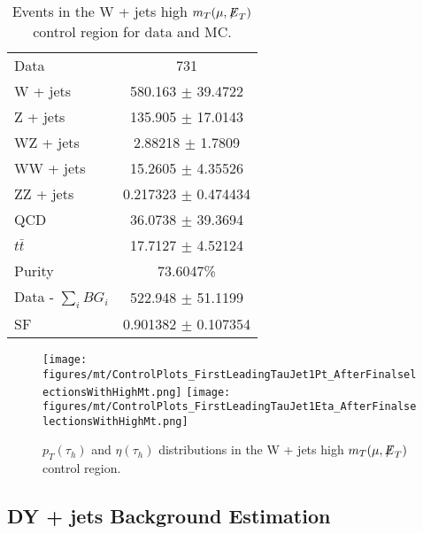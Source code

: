 \begin{table}[ht]
\begin{center}
 \caption{ Events in the W + jets high $m_{T}(\mu,{\not\mathrel{E}}_T)$ control region for data and MC.}
 \begin{tabular}{| l | c |}
 \hline\hline
Data & 731 \\
W + jets & 580.163 $\pm$ 39.4722 \\
Z + jets & 135.905 $\pm$ 17.0143 \\
WZ + jets & 2.88218 $\pm$ 1.7809 \\
WW + jets & 15.2605 $\pm$ 4.35526 \\
ZZ + jets & 0.217323 $\pm$ 0.474434 \\
QCD & 36.0738 $\pm$ 39.3694 \\
$t\bar{t}$ & 17.7127 $\pm$ 4.52124 \\ \hline
Purity & 73.6047\% \\
Data - $\sum\limits_{i} BG_{i}$ & 522.948 $\pm$ 51.1199 \\ \hline
SF & 0.901382 $\pm$ 0.107354 \\
 \hline
 \hline
 \end{tabular}
 \label{tab:muTauHighMt}
\end{center}
\end{table}

\begin{figure}\centering
  \texttt{[image: figures/mt/ControlPlots\_FirstLeadingTauJet1Pt\_AfterFinalselectionsWithHighMt.png]}
  \texttt{[image: figures/mt/ControlPlots\_FirstLeadingTauJet1Eta\_AfterFinalselectionsWithHighMt.png]} 
  \caption{\label{fig:muTauHighMtControlPlots} $p_{T}(\tau_{h})$ and $\eta(\tau_{h})$ distributions in the W + jets high $m_{T}(\mu,{\not\mathrel{E}}_T)$ control region.}
\end{figure}

\subsection{DY + jets Background Estimation}

